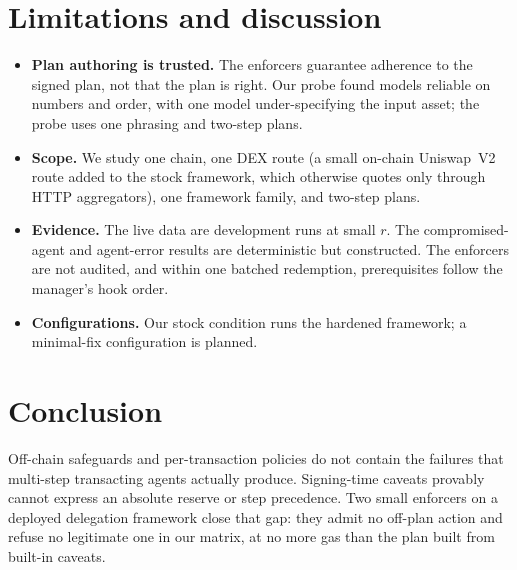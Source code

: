 \documentclass[conference]{IEEEtran}
\begin{document}
\section{Limitations and discussion}\label{sec:limits}

\begin{itemize}
\item \textbf{Plan authoring is trusted.} The enforcers guarantee adherence to the signed plan, not that the plan is
right. Our probe found models reliable on numbers and order, with one model under-specifying the input asset; the
probe uses one phrasing and two-step plans.
\item \textbf{Scope.} We study one chain, one DEX route (a small on-chain Uniswap~V2 route added to the stock
framework, which otherwise quotes only through HTTP aggregators), one framework family, and two-step plans.
\item \textbf{Evidence.} The live data are development runs at small $r$. The compromised-agent and agent-error
results are deterministic but constructed. The enforcers are not audited, and within one batched redemption,
prerequisites follow the manager's hook order.
\item \textbf{Configurations.} Our stock condition runs the hardened framework; a minimal-fix configuration is
planned.
\end{itemize}

\section{Conclusion}

Off-chain safeguards and per-transaction policies do not contain the failures that multi-step transacting agents
actually produce. Signing-time caveats provably cannot express an absolute reserve or step precedence. Two small
enforcers on a deployed delegation framework close that gap: they admit no off-plan action and refuse no legitimate
one in our matrix, at no more gas than the plan built from built-in caveats.



\end{document}
